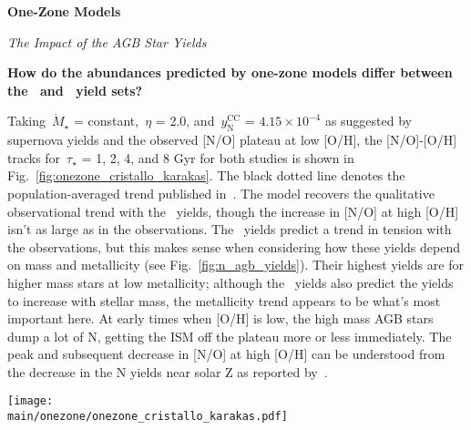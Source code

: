 \documentclass[\main/notes.tex]{subfiles}
\begin{document}
 
\begin{center} 
\textbf{{\Large One-Zone Models}} 
\end{center} 

\noindent 
{\Large \textit{The Impact of the AGB Star Yields}} 
\par\noindent 
\textbf{How do the abundances predicted by one-zone models differ between 
the~\citet{Cristallo2011} and~\citet{Karakas2010} yield sets?} 
\par\noindent 
Taking~$\dot{M}_\star$ = constant,~$\eta$ = 2.0, and~$y_\text{N}^\text{CC}$ = 
$4.15\times10^{-4}$ as suggested by supernova yields and the observed 
[N/O] plateau at low [O/H], the [N/O]-[O/H] tracks for~$\tau_\star$ = 1, 2, 4, 
and 8 Gyr for both studies is shown in Fig.~\ref{fig:onezone_cristallo_karakas}. 
The black dotted line denotes the population-averaged trend published 
in~\citet*{Henry2000}. 
The model recovers the qualitative observational trend with 
the~\citet{Cristallo2011} yields, though the increase in [N/O] at high [O/H] 
isn't as large as in the observations. 
The~\citet{Karakas2010} yields predict a trend in tension with the observations, 
but this makes sense when considering how these yields depend on mass and 
metallicity (see Fig.~\ref{fig:n_agb_yields}). 
Their highest yields are for higher mass stars at low metallicity; although 
the~\citet{Cristallo2011} yields also predict the yields to increase with 
stellar mass, the metallicity trend appears to be what's most important here. 
At early times when [O/H] is low, the high mass AGB stars dump a lot of N, 
getting the ISM off the plateau more or less immediately. 
The peak and subsequent decrease in [N/O] at high [O/H] can be understood from 
the decrease in the N yields near solar Z as reported by~\citet{Karakas2010}. 

\begin{figure*} 
\texttt{[image: \\main/onezone/onezone\_cristallo\_karakas.pdf]} 
\caption{[N/O]-[O/H] tracks as predicted by~\citet{Cristallo2011} (left) 
and~\citet{Karakas2010} (right). 
Colored lines denote different SFE timescales denoted in the legend in the 
upper left. 
The black dotted line denotes the fit to the observed [N/O]-[O/H] relation 
published in~\citet*{Henry2000}. } 
\label{fig:onezone_cristallo_karakas} 
\end{figure*} 
\end{document}
